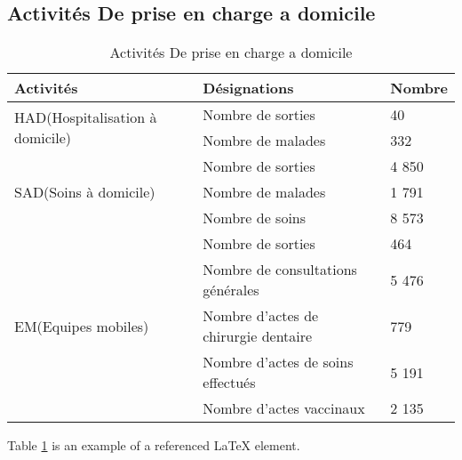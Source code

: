 \subsection{Activités De prise en charge a domicile}
\begin{table}[h!]
\begin{center}
\begin{tabular}{|p{6cm}|p{7cm}|p{2cm}|}
\hline
  Activités	                                       &Désignations	         &Nombre\\
 \hline
 \multirow{2}{*}{HAD(Hospitalisation à domicile)}  &Nombre de sorties      &40\\
                                                   &Nombre de malades      &332\\

 \hline
 \multirow{3}{*}{SAD(Soins à domicile)}  &Nombre de sorties      &4 850\\
                                                   &Nombre de malades      &1 791\\
                                                   &Nombre de soins        &8 573\\


\hline
 \multirow{5}{*}{EM(Equipes mobiles)}  &Nombre de sorties                    &464\\
                                       &Nombre de consultations générales    &5 476\\
                                       &Nombre d’actes de chirurgie dentaire &779\\
                                       &Nombre d’actes de soins effectués	   &5 191\\
                                       &Nombre d’actes vaccinaux             &2 135\\
\hline
\end{tabular}
\end{center}
\caption{Activités De prise en charge a domicile}
\label{table:10}
\end{table}
Table \ref{table:10} is an example of a referenced \LaTeX{} element.

